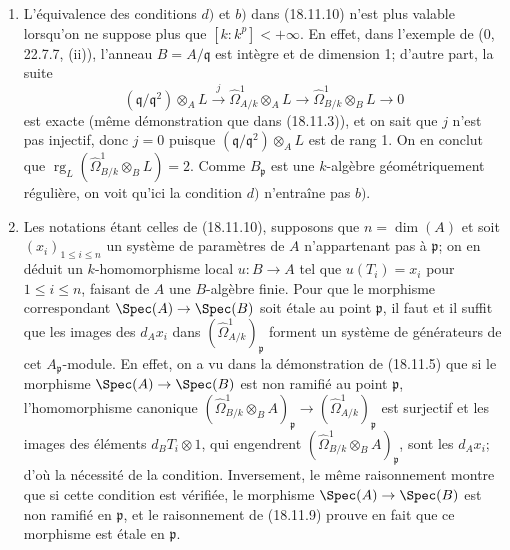 \begin{remarks}[18.11.11]
\label{IV.18.11.11}
\begin{enumerate}
  \item[(i)] L'équivalence des conditions $d)$ et $b)$ dans (18.11.10) n'est plus valable lorsqu'on ne suppose plus que $[k:k^p]<+\infty$. En effet, dans l'exemple de (0, 22.7.7, (ii)), l'anneau $B=A/\mathfrak q$ est intègre et de dimension 1; d'autre part, la suite
  \[
    (\mathfrak q/\mathfrak q^2)\otimes_A L\xrightarrow{j}\hat{\Omega}^1_{A/k}\otimes_A L\longrightarrow\hat{\Omega}^1_{B/k}\otimes_B L\longrightarrow0
  \]
  est exacte (même démonstration que dans (18.11.3)), et on sait que $j$ n'est pas injectif, donc $j=0$ puisque $(\mathfrak q/\mathfrak q^2)\otimes_A L$ est de rang 1. On en conclut que $\operatorname{rg}_L(\hat{\Omega}^1_{B/k}\otimes_B L)=2$. Comme $B_{\mathfrak p}$ est une $k$-algèbre géométriquement régulière, on voit qu'ici la condition $d)$ n'entraîne pas $b)$.
  \item[(ii)] Les notations étant celles de (18.11.10), supposons que $n=\dim(A)$ et soit $(x_i)_{1\leq i\leq n}$ un système de paramètres de $A$ n'appartenant pas à $\mathfrak p$; on en déduit un $k$-homomorphisme local $u:B\to A$ tel que $u(T_i)=x_i$ pour $1\leq i\leq n$, faisant de $A$ une $B$-algèbre finie. Pour que le morphisme correspondant $\Spec(A)\to\Spec(B)$ soit étale au point $\mathfrak p$, il faut et il suffit que les images des $d_Ax_i$ dans $(\hat{\Omega}^1_{A/k})_{\mathfrak p}$ forment un système de générateurs de cet $A_{\mathfrak p}$-module. En effet, on a vu dans la démonstration de (18.11.5) que si le morphisme $\Spec(A)\to\Spec(B)$ est non ramifié au point $\mathfrak p$, l'homomorphisme canonique $(\hat{\Omega}^1_{B/k}\otimes_B A)_{\mathfrak p}\to(\hat{\Omega}^1_{A/k})_{\mathfrak p}$ est surjectif et les images des éléments $d_BT_i\otimes1$, qui engendrent $(\hat{\Omega}^1_{B/k}\otimes_B A)_{\mathfrak p}$, sont les $d_Ax_i$; d'où la nécessité de la condition. Inversement, le même raisonnement montre que si cette condition est vérifiée, le morphisme $\Spec(A)\to\Spec(B)$ est non ramifié en $\mathfrak p$, et le raisonnement de (18.11.9) prouve en fait que ce morphisme est étale en $\mathfrak p$.
\end{enumerate}
\end{remarks}

